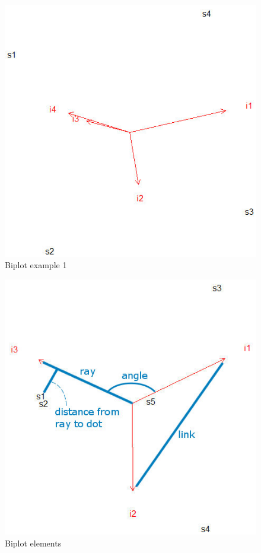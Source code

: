 \begin{figure}
	\center
\includegraphics[scale=0.5]{fig/biplot1}
\caption{\label{fig:Biplot-Example-1}Biplot example 1}
\end{figure}

\begin{figure}
	\center
\includegraphics[scale=0.5]{fig/biplot2}
\caption{\label{fig:Biplot-Elements}Biplot elements}
\end{figure}

